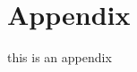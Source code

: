 \documentclass[../thesis.tex]{subfiles} %
\begin{document}
\section{Appendix}
\beginSupp
this is an appendix
\end{document}
